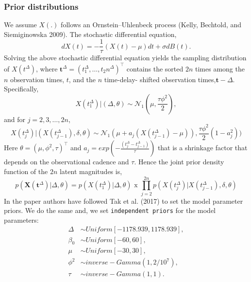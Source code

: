 \documentclass{article}
\begin{document}
\subsubsection*{Prior distributions}
We assume $X (.)$ follows an Ornstein–Uhlenbeck process
(Kelly, Bechtold, and Siemiginowska 2009). The stochastic differential equation,
\begin{equation*}
    dX(t)=-\frac{1}{\tau}(X(t)-\mu)dt+\sigma dB(t).
\end{equation*}
Solving the above stochastic differential equation yields the sampling distribution of $X(t^{\Delta})$, where $\boldsymbol{t}^{\Delta} = (t_1^{\Delta},\ldots,t_2n^{\Delta})^\top$ contains the sorted $2n$
times among the $n$ observation times, $t$, and the $n$ time-delay-
shifted observation times,$\boldsymbol{t} - \Delta$. Specifically,
\begin{equation*}
    X(t_1^{\Delta})|(\Delta,\theta) \sim \mathcal{N}_1(\mu,\frac{\tau \phi^2}{2}),
\end{equation*}
and for $j = 2, 3, \ldots , 2n$,
\begin{equation*}
    X(t_j^{\Delta})|(X(t_{j-1}^{\Delta}),\delta,\theta) \sim \mathcal{N}_1(\mu+a_j(X(t_{j-1}^{\Delta})-\mu)),\frac{\tau \phi^2}{2}(1-a_j^2))
\end{equation*}
Here $\theta=(\mu,\phi^2,\tau)^\top$ and  $a_j=exp\left(-\frac{(t_j^{\Delta}-t_{j-1}^{\Delta})}{\tau}\right)$ that is a shrinkage factor that depends on the
observational cadence and $\tau$. Hence the joint prior density function of the $2n$ latent magnitudes is,
\begin{equation*}
    p(\mathbf{X}(\boldsymbol{t}^{\Delta})|\Delta,\theta) = p(X(t_1^{\Delta})|\Delta,\theta) \text{ x } \prod_{j=2}^{2n} p(X(t_j^{\Delta})|X(t_{j-1}^{\Delta}),\delta,\theta)
\end{equation*}
In the paper authors have followed Tak et al. (2017) to set the model parameter priors. We do the same and, we set \texttt{independent priors} for the model parameters:
\begin{align*}
    \Delta & \sim Uniform[−1178.939, 1178.939],\\
    \beta_0 & \sim Uniform[−60, 60],\\
    \mu & \sim Uniform[−30, 30],\\
    \phi^2 & \sim inverse-Gamma(1, 2/10^7 ),\\
    \tau & \sim inverse-Gamma(1, 1).
\end{align*}
\end{document}
